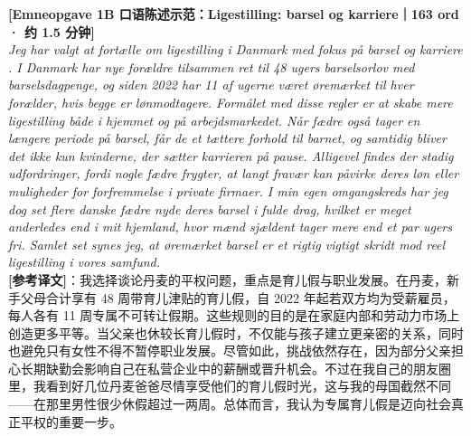 \begin{transbox}
\small
\textbf{\color{NCDNavy}[Emneopgave 1B 口语陈述示范：Ligestilling: barsel og karriere｜163 ord · 约 1.5 分钟]}\\
\textit{Jeg har valgt at fortælle om ligestilling  i Danmark med fokus på barsel og karriere . I Danmark har nye forældre tilsammen ret til 48 ugers barselsorlov med barselsdagpenge, og siden 2022 har 11 af ugerne været øremærket  til hver forælder, hvis begge er lønmodtagere. Formålet med disse regler er at skabe mere ligestilling både i hjemmet og på arbejdsmarkedet. Når fædre også tager en længere periode på barsel, får de et tættere forhold til barnet, og samtidig bliver det ikke kun kvinderne, der sætter karrieren på pause. Alligevel findes der stadig udfordringer, fordi nogle fædre frygter, at langt fravær kan påvirke deres løn eller muligheder for forfremmelse  i private firmaer. I min egen omgangskreds har jeg dog set flere danske fædre nyde deres barsel i fulde drag, hvilket er meget anderledes end i mit hjemland, hvor mænd sjældent tager mere end et par ugers fri. Samlet set synes jeg, at øremærket barsel er et rigtig vigtigt skridt mod reel ligestilling i vores samfund.}\\[4pt]
\textbf{\color{NCDTeal}[参考译文]}：我选择谈论丹麦的平权问题，重点是育儿假与职业发展。在丹麦，新手父母合计享有 48 周带育儿津贴的育儿假，自 2022 年起若双方均为受薪雇员，每人各有 11 周专属不可转让假期。这些规则的目的是在家庭内部和劳动力市场上创造更多平等。当父亲也休较长育儿假时，不仅能与孩子建立更亲密的关系，同时也避免只有女性不得不暂停职业发展。尽管如此，挑战依然存在，因为部分父亲担心长期缺勤会影响自己在私营企业中的薪酬或晋升机会。不过在我自己的朋友圈里，我看到好几位丹麦爸爸尽情享受他们的育儿假时光，这与我的母国截然不同——在那里男性很少休假超过一两周。总体而言，我认为专属育儿假是迈向社会真正平权的重要一步。
\end{transbox}

